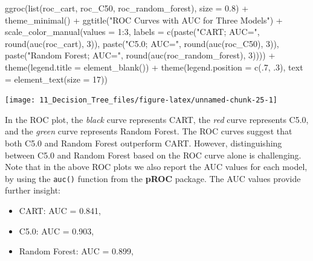 \documentclass[
  11pt,
]{book}
\makeatletter
\newenvironment{Shaded}{}{}
\newcommand{\AttributeTok}[1]{#1}
\newcommand{\DecValTok}[1]{#1}
\newcommand{\FloatTok}[1]{#1}
\newcommand{\FunctionTok}[1]{#1}
\newcommand{\NormalTok}[1]{#1}
\newcommand{\SpecialCharTok}[1]{\textcolor[rgb]{0.39,0.39,0.39}{#1}}
\newcommand{\StringTok}[1]{\textcolor[rgb]{0.39,0.39,0.39}{#1}}
\providecommand{\tightlist}{%
  \setlength{\itemsep}{0pt}\setlength{\parskip}{0pt}}
\newenvironment{kframe}{%
\medskip{}
\setlength{\fboxsep}{.8em}
 \def\at@end@of@kframe{}%
 \ifinner\ifhmode%
  \def\at@end@of@kframe{\end{minipage}}%
  \begin{minipage}{\columnwidth}%
 \fi\fi%
 \def\FrameCommand##1{\hskip\@totalleftmargin \hskip-\fboxsep
 \colorbox{shadecolor}{##1}\hskip-\fboxsep
     \hskip-\linewidth \hskip-\@totalleftmargin \hskip\columnwidth}%
 \MakeFramed {\advance\hsize-\width
   \@totalleftmargin\z@ \linewidth\hsize
   \@setminipage}}%
 {\par\unskip\endMakeFramed%
 \at@end@of@kframe}
\renewenvironment{Shaded}{\begin{kframe}}{\end{kframe}}
\theoremstyle{definition}
\theoremstyle{definition}
\theoremstyle{definition}
\theoremstyle{definition}
\theoremstyle{remark}
\makeatother
\begin{document}
\begin{Shaded}
\begin{Highlighting}[]
\FunctionTok{ggroc}\NormalTok{(}\FunctionTok{list}\NormalTok{(roc\_cart, roc\_C50, roc\_random\_forest), }\AttributeTok{size =} \FloatTok{0.8}\NormalTok{) }\SpecialCharTok{+} 
    \FunctionTok{theme\_minimal}\NormalTok{() }\SpecialCharTok{+} \FunctionTok{ggtitle}\NormalTok{(}\StringTok{"ROC Curves with AUC for Three Models"}\NormalTok{) }\SpecialCharTok{+}
  \FunctionTok{scale\_color\_manual}\NormalTok{(}\AttributeTok{values =} \DecValTok{1}\SpecialCharTok{:}\DecValTok{3}\NormalTok{, }
    \AttributeTok{labels =} \FunctionTok{c}\NormalTok{(}\FunctionTok{paste}\NormalTok{(}\StringTok{"CART; AUC="}\NormalTok{, }\FunctionTok{round}\NormalTok{(}\FunctionTok{auc}\NormalTok{(roc\_cart), }\DecValTok{3}\NormalTok{)), }
                \FunctionTok{paste}\NormalTok{(}\StringTok{"C5.0; AUC="}\NormalTok{, }\FunctionTok{round}\NormalTok{(}\FunctionTok{auc}\NormalTok{(roc\_C50), }\DecValTok{3}\NormalTok{)), }
                \FunctionTok{paste}\NormalTok{(}\StringTok{"Random Forest; AUC="}\NormalTok{, }\FunctionTok{round}\NormalTok{(}\FunctionTok{auc}\NormalTok{(roc\_random\_forest), }\DecValTok{3}\NormalTok{)))) }\SpecialCharTok{+}
  \FunctionTok{theme}\NormalTok{(}\AttributeTok{legend.title =} \FunctionTok{element\_blank}\NormalTok{()) }\SpecialCharTok{+}
  \FunctionTok{theme}\NormalTok{(}\AttributeTok{legend.position =} \FunctionTok{c}\NormalTok{(.}\DecValTok{7}\NormalTok{, .}\DecValTok{3}\NormalTok{), }\AttributeTok{text =} \FunctionTok{element\_text}\NormalTok{(}\AttributeTok{size =} \DecValTok{17}\NormalTok{))}
\end{Highlighting}
\end{Shaded}

\begin{center}\texttt{[image: 11\_Decision\_Tree\_files/figure-latex/unnamed-chunk-25-1]} \end{center}

In the ROC plot, the \emph{black} curve represents CART, the {\emph{red}} curve represents C5.0, and the {\emph{green}} curve represents Random Forest. The ROC curves suggest that both C5.0 and Random Forest outperform CART. However, distinguishing between C5.0 and Random Forest based on the ROC curve alone is challenging. Note that in the above ROC plots we also report the AUC values for each model, by using the \texttt{auc()} function from the \textbf{pROC} package. The AUC values provide further insight:

\begin{itemize}
\tightlist
\item
  CART: AUC = 0.841,\\
\item
  C5.0: AUC = 0.903,
\item
  Random Forest: AUC = 0.899,
\end{itemize}
\end{document}
